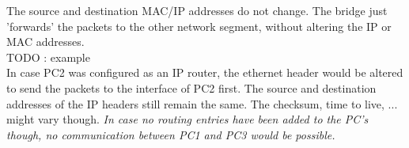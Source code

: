 The source and destination MAC/IP addresses do not change. The bridge just 'forwards' the packets to the other network segment, without altering the IP or MAC addresses. \\

TODO : example \\

In case PC2 was configured as an IP router, the ethernet header would be altered to send the packets to the interface of PC2 first. The source and destination addresses of the IP headers still remain the same. The checksum, time to live, ... might vary though.
\textit{In case no routing entries have been added to the PC's though, no communication between PC1 and PC3 would be possible.}
